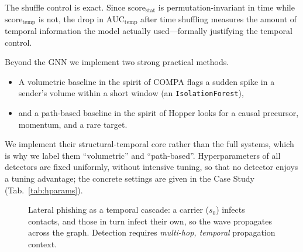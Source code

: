 The shuffle control is exact. Since $\mathrm{score}_{\mathrm{stat}}$ is permutation-invariant in time
while $\mathrm{score}_{\mathrm{temp}}$ is not, the drop in $\mathrm{AUC}_{\mathrm{temp}}$ after time shuffling
measures the amount of temporal information the model actually used---formally justifying the temporal
control.

\smallskip Beyond the GNN we implement two strong practical methods.
\begin{itemize}[noitemsep,topsep=2pt]
  \item A volumetric baseline in the spirit of COMPA \citep{egele2013compa,stringhini2015thataint} flags a sudden spike
  in a sender's volume within a short window (an \texttt{IsolationForest}),
  \item and a path-based baseline in the spirit
  of Hopper \citep{ho2021hopper} looks for a causal precursor, momentum, and a rare target.
\end{itemize}
We implement their structural-temporal core rather than the full systems, which is why we label them ``volumetric'' and
``path-based''. Hyperparameters of all detectors are fixed uniformly, without intensive tuning, so that no
detector enjoys a tuning advantage; the concrete settings are given in the Case Study (Tab.~\ref{tab:hparams}).

\begin{figure}[t]\centering
{}
\caption[Lateral phishing as a temporal cascade]{Lateral phishing as a temporal cascade: a carrier ($s_0$)
infects contacts, and those in turn infect their own, so the wave propagates across the graph. Detection requires \emph{multi-hop,
temporal} propagation context.}
\label{fig:cascade}
\end{figure}

